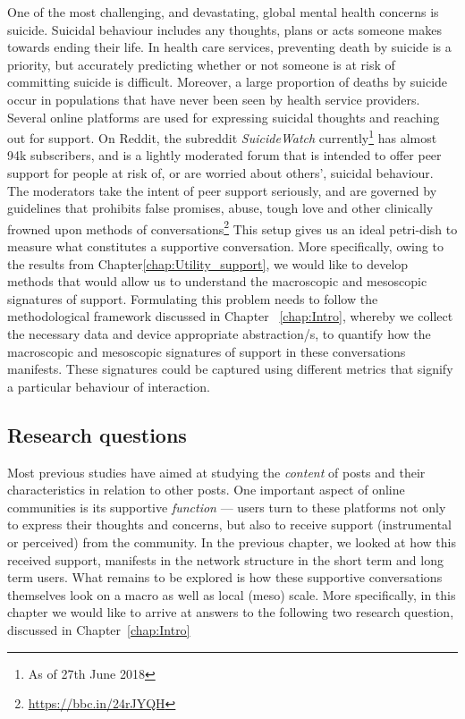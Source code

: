 One of the most challenging, and devastating, global mental health concerns is suicide. Suicidal behaviour includes any thoughts, plans or acts someone makes towards ending their life. In health care services, preventing death by suicide is a priority, but accurately predicting whether or not someone is at risk of committing suicide is difficult. Moreover, a large proportion of deaths by suicide occur in populations that have never been seen by health service providers. Several online platforms are used for expressing suicidal thoughts and reaching out for support. On Reddit, the subreddit \emph{SuicideWatch} currently\footnote{As of 27th June 2018} has almost 94k subscribers, and is a lightly moderated forum that is intended to offer peer support for people at risk of, or are worried about others', suicidal behaviour. The moderators take the intent of peer support seriously, and are governed by guidelines that prohibits false promises, abuse, tough love and other clinically frowned upon methods of conversations\footnote{\url{https://bbc.in/24rJYQH} }
This setup gives us an ideal petri-dish to measure what constitutes a supportive conversation. More specifically, owing to the results from Chapter\ref{chap:Utility_support}, we would like to develop methods that would allow us to understand the macroscopic and mesoscopic signatures of support. Formulating this problem needs to follow the methodological framework discussed in Chapter ~\ref{chap:Intro}, whereby we collect the necessary data and device appropriate abstraction/s, to quantify how the macroscopic and mesoscopic signatures of support in these conversations manifests. These signatures could be captured using different metrics that signify a particular behaviour of interaction.

\subsection{Research questions}
Most previous studies have aimed at studying the \emph{content} of posts and their characteristics in relation to other posts. One important aspect of online communities is its supportive \emph{function} --- users turn to these platforms not only to express their thoughts and concerns, but also to receive support (instrumental or perceived) from the community. In the previous chapter, we looked at how this received support, manifests in the network structure in the short term and long term users. What remains to be explored is how these supportive conversations themselves look on a macro as well as local (meso) scale. More specifically, in this chapter we would like to arrive at answers to the following two research question, discussed in Chapter~\ref{chap:Intro}

